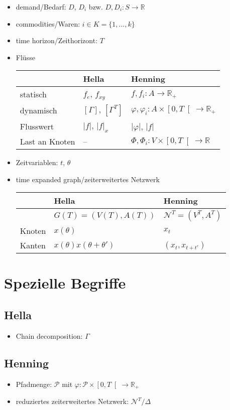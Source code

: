 \documentclass[12pt, a4paper]{article}
\newcommand{\R}{\mathbb{R}}
\newcommand{\ropen}[1]{\ensuremath{\left[#1\right[}}
\newcommand{\func}[3]{\ensuremath{{#1} \colon {#2} \to {#3}}}
\newcommand{\graph}{\mathcal{N}}
\newcommand{\tExp}[1]{\ensuremath{\graph^{#1}}}
\newcommand{\redNetw}[2]{\tExp{#1}\!/{#2}}
\newcommand{\pathSet}{\mathcal{P}}
\begin{document}
\begin{itemize}
\begin{itemize}
	    \end{itemize}
    \item demand/Bedarf: $D$, $D_i$ bzw. $\func{D, D_i}{S}{\R}$
    \item commodities/Waren: $i \in K = \{1, \ldots, k\}$
    \item time horizon/Zeithorizont: $T$
    \item Flüsse \\
    	\begin{tabular}{l|l|l}
    		 & Hella & Henning \\ \hline
    		statisch & $f_e$, $f_{xy}$ & $\func{f, f_i}{A}{\R_+}$ \\
    		dynamisch & $\left[ \Gamma \right]$, $\left[ \Gamma^T \right]$
    		            & $\func{\varphi, \varphi_i}{A \times \ropen{0, T}}{\R_+}$ \\
    		Flusswert & $|f|$, $|f|_x$ & $|\varphi|$, $|f|$ \\
    		Last an Knoten & -- & $\func{\Phi, \Phi_i}{V \times \ropen{0, T}}{\R}$
    	\end{tabular}
	\item Zeitvariablen: $t$, $\theta$
	\item time expanded graph/zeiterweitertes Netzwerk\\
    	\begin{tabular}{l|l|l}
    		& Hella & Henning \\ \hline
    		& $G(T) = (V(T), A(T))$ & $\tExp{T} = (V^T, A^T)$ \\
    		Knoten & $x(\theta)$ & $x_t$ \\
    		Kanten & $x(\theta)x(\theta + \theta')$ & $(x_t, x_{t + t'})$
    	\end{tabular}
    
    
\end{itemize}

\section*{Spezielle Begriffe}
\subsection*{Hella}
\begin{itemize}
    \item Chain decomposition: $\Gamma$
\end{itemize}

\subsection*{Henning}
\begin{itemize}
    \item Pfadmenge: $\pathSet$ mit $\func{\varphi}{\pathSet \times \ropen{0,T}}{\R_+}$
    \item reduziertes zeiterweitertes Netzwerk: $\redNetw{T}{\Delta}$
\end{itemize}
\end{document}
